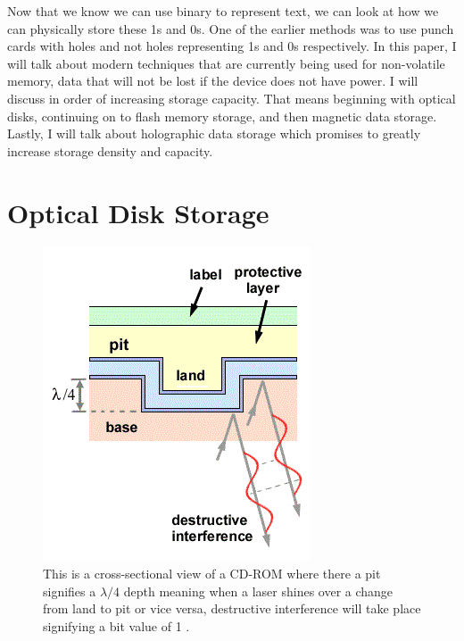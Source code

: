 \documentclass[ notitlepage, numerical, 11pt]{revtex4-1} %
\begin{document}
Now that we know we can use binary to represent text, we can look at how we can physically store these 1s and 0s. One of the earlier methods was to use punch cards with holes and not holes representing 1s and 0s respectively. In this paper, I will talk about modern techniques that are currently being used for non-volatile memory, data that will not be lost if the device does not have power. I will discuss in order of increasing storage capacity. That means beginning with optical disks, continuing on to flash memory storage, and then magnetic data storage. Lastly, I will talk about holographic data storage which promises to greatly increase storage density and capacity.





\section{Optical Disk Storage}
\begin{figure}[H]
\centerline{\includegraphics[scale=.9]{cdRom.png}}
\caption{ This is a cross-sectional view of a CD-ROM where there a pit signifies a $\lambda/4$ depth meaning when a laser shines over a change from land to pit or vice versa, destructive interference will take place signifying a bit value of 1 \cite{cdCross}.}
\label{cdRom}
\end{figure}
\end{document}

